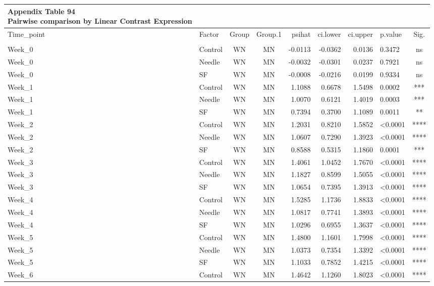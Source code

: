\documentclass[
  12pt,
  letterpaper,
]{article}
\begin{document}
\begin{longtable}{llccrrrlc}
\caption*{
{\large \textbf{Appendix Table 94}} \\ 
{\small \textbf{Pairwise comparison by Linear Contrast Expression}}
} \\ 
\toprule
Time\_point & Factor & Group & Group.1 & psihat & ci.lower & ci.upper & p.value & Sig. \\ 
\midrule\addlinespace[2.5pt]
\multicolumn{9}{l}{Split by Route} \\ 
\midrule\addlinespace[2.5pt]
Week\_0 & Control & WN & MN & -0.0113 & -0.0362 & 0.0136 & 0.3472 & ns \\ 
Week\_0 & Needle & WN & MN & -0.0032 & -0.0301 & 0.0237 & 0.7921 & ns \\ 
Week\_0 & SF & WN & MN & -0.0008 & -0.0216 & 0.0199 & 0.9334 & ns \\ 
Week\_1 & Control & WN & MN & 1.1088 & 0.6678 & 1.5498 & 0.0002 & *** \\ 
Week\_1 & Needle & WN & MN & 1.0070 & 0.6121 & 1.4019 & 0.0003 & *** \\ 
Week\_1 & SF & WN & MN & 0.7394 & 0.3700 & 1.1089 & 0.0011 & ** \\ 
Week\_2 & Control & WN & MN & 1.2031 & 0.8210 & 1.5852 & <0.0001 & **** \\ 
Week\_2 & Needle & WN & MN & 1.0607 & 0.7290 & 1.3923 & <0.0001 & **** \\ 
Week\_2 & SF & WN & MN & 0.8588 & 0.5315 & 1.1860 & 0.0001 & *** \\ 
Week\_3 & Control & WN & MN & 1.4061 & 1.0452 & 1.7670 & <0.0001 & **** \\ 
Week\_3 & Needle & WN & MN & 1.1827 & 0.8599 & 1.5055 & <0.0001 & **** \\ 
Week\_3 & SF & WN & MN & 1.0654 & 0.7395 & 1.3913 & <0.0001 & **** \\ 
Week\_4 & Control & WN & MN & 1.5285 & 1.1736 & 1.8833 & <0.0001 & **** \\ 
Week\_4 & Needle & WN & MN & 1.0817 & 0.7741 & 1.3893 & <0.0001 & **** \\ 
Week\_4 & SF & WN & MN & 1.0296 & 0.6955 & 1.3637 & <0.0001 & **** \\ 
Week\_5 & Control & WN & MN & 1.4800 & 1.1601 & 1.7998 & <0.0001 & **** \\ 
Week\_5 & Needle & WN & MN & 1.0373 & 0.7354 & 1.3392 & <0.0001 & **** \\ 
Week\_5 & SF & WN & MN & 1.1033 & 0.7852 & 1.4215 & <0.0001 & **** \\ 
Week\_6 & Control & WN & MN & 1.4642 & 1.1260 & 1.8023 & <0.0001 & **** \\ 

\end{longtable}
\end{document}
